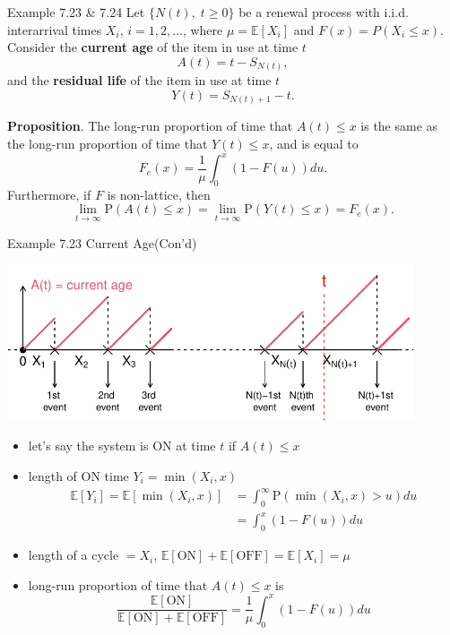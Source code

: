 \documentclass[letterpaper,handout, mathserif]{beamer}
\def\p{\mathrm P}
\def\E{\mathbb E}
\begin{document}
\begin{frame}{Example 7.23 \& 7.24}
Let $\{N(t),\;t \geq 0\}$ be a renewal process with i.i.d. interarrival times
$X_i$, $i = 1,2,\ldots$, where $\mu = \E[X_i]$ and $F(x) = P(X_i\le x)$.
Consider the {\bf current age} of the item in use at time $t$
$$A(t) = t - S_{N(t)},$$
and the {\bf residual life} of the item in use at time $t$
$$Y(t) = S_{N(t)+1}- t.$$

{\bf Proposition}. The long-run proportion of time that $A(t) \le x$ is the
same as the long-run proportion of time that $Y(t) \le x$, and is equal to
$$
F_e(x) =\frac{1}{\mu}\int_0^x(1 - F(u))du.
$$
Furthermore, if $F$ is non-lattice, then
$$\lim_{t\to\infty}\p(A(t)\le x) = \lim_{t\to\infty}\p(Y(t)\le x) = F_e(x).$$
\end{frame}
\begin{frame}{Example 7.23 Current Age(Con'd)}
\begin{center}
\includegraphics[width=0.9\textwidth, trim=0 45 0 0, clip]{L17_CurrentAge.pdf}
\end{center}
\begin{itemize}
\item let's say the system is ON at time $t$ if $A(t) \le x$
\item length of ON time $Y_i= \min(X_i,x)$
\begin{align*}
\E[Y_i] = \E[\min(X_i,x)] &= \int_0^{\infty}\p(\min(X_i,x) > u)du\\
&=\int_0^x (1 - F(u))du
\end{align*}
\item length of a cycle $= X_i$, $\E[\text{ON}] + \E[\text{OFF}] = \E[X_i] = \mu$
\item long-run proportion of time that $A(t) \le x$ is
$$\frac{\E[\text{ON}]}{\E[\text{ON}] + \E[\text{OFF}]}=\frac{1}{\mu}\int_0^x (1 - F(u))du$$
\end{itemize}
\end{frame}
\end{document}
